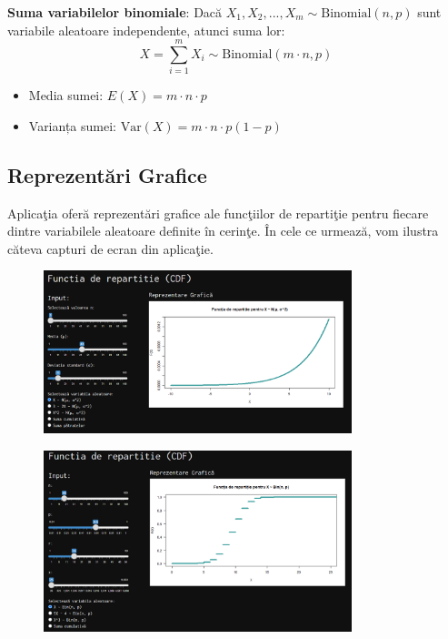 \documentclass[a4paper,11pt]{article}
\begin{document}
\begin{itemize}
  \textbf{Suma variabilelor binomiale}:  
  Dacă $X_1, X_2, ..., X_m \sim \text{Binomial}(n, p)$ sunt variabile aleatoare independente, atunci suma lor:
  \[
  X = \sum_{i=1}^{m} X_i \sim \text{Binomial}(m \cdot n, p)
  \]
  \begin{itemize}
    \item Media sumei: $E(X) = m \cdot n \cdot p$
    \item Varianța sumei: $\text{Var}(X) = m \cdot n \cdot p (1 - p)$
  \end{itemize}

\end{itemize}

\newpage

\subsection*{Reprezent\u{a}ri Grafice}

Aplica\c{t}ia ofer\u{a} reprezent\u{a}ri grafice ale func\c{t}iilor de reparti\c{t}ie pentru fiecare dintre variabilele aleatoare definite în cerin\c{t}e. În cele ce urmeaz\u{a}, vom ilustra c\u{a}teva capturi de ecran din aplica\c{t}ie.

\begin{figure}[h!]
  \centering
  \includegraphics[width=0.8\textwidth]{./img/4.png}
  \label{fig:imaginea_ta_3}
\end{figure}

\begin{figure}[h!]
  \centering
  \includegraphics[width=0.8\textwidth]{./img/5.png}
  \label{fig:imaginea_ta_3}
\end{figure}
\end{document}
